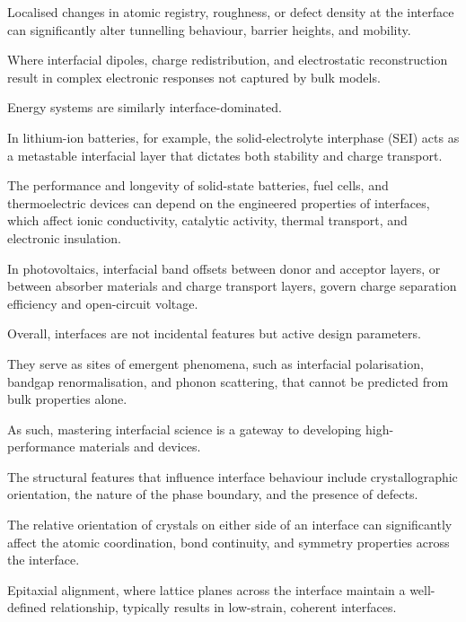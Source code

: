 Localised changes in atomic registry, roughness, or defect density at the interface can significantly alter tunnelling
behaviour, barrier heights, and mobility.

Where interfacial dipoles, charge redistribution, and electrostatic reconstruction result in complex electronic
responses not captured by bulk models.

\label{para:energy_interfaces} %

Energy systems are similarly interface-dominated.

In lithium-ion batteries, for example, the solid-electrolyte interphase (SEI) acts as a metastable interfacial layer
that dictates both stability and charge transport.

The performance and longevity of solid-state batteries, fuel cells, and thermoelectric devices can depend on the
engineered properties of interfaces, which affect ionic conductivity, catalytic activity, thermal transport, and
electronic insulation.

In photovoltaics, interfacial band offsets between donor and acceptor layers, or between absorber materials and charge
transport layers, govern charge separation efficiency and open-circuit voltage.

\label{para:interface_design_parameters} %

Overall, interfaces are not incidental features but active design parameters.

They serve as sites of emergent phenomena, such as interfacial polarisation, bandgap renormalisation, and phonon
scattering, that cannot be predicted from bulk properties alone.

As such, mastering interfacial science is a gateway to developing high-performance materials and devices.

\label{para:interface_definition} %

The structural features that influence interface behaviour include crystallographic orientation, the nature of the phase
boundary, and the presence of defects.

\label{para:orientation_effects} %

The relative orientation of crystals on either side of an interface can significantly affect the atomic coordination,
bond continuity, and symmetry properties across the interface.

Epitaxial alignment, where lattice planes across the interface maintain a well-defined relationship, typically results
in low-strain, coherent interfaces.

